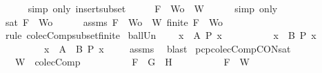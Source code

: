 \begin{isabellebody}
\ \ \ \ \isamarkupfalse%
\ {\isacharparenleft}simp\ only{\isacharcolon}\ insert{\isacharunderscore}subset{\isacharparenright}\isanewline
\ \ \isamarkupfalse%
\ \isamarkupfalse%
\ {\isachardoublequoteopen}{\isacharbraceleft}F{\isacharbraceright}\ {\isasymunion}\ Wo\ {\isasymsubseteq}\ W{\isachardoublequoteclose}\isanewline
\ \ \ \ \isamarkupfalse%
\ {\isacharparenleft}simp\ only{\isacharcolon}\ {}{\isacharparenright}\isanewline
\ \ \isamarkupfalse%
\ {\isachardoublequoteopen}sat\ {\isacharparenleft}{\isacharbraceleft}F{\isacharbraceright}\ {\isasymunion}\ Wo{\isacharparenright}{\isachardoublequoteclose}\isanewline
\ \ \ \ \isamarkupfalse%
\ assms{\isacharparenleft}{}{\isacharparenright}\ {\isacartoucheopen}{\isacharbraceleft}F{\isacharbraceright}\ {\isasymunion}\ Wo\ {\isasymsubseteq}\ W{\isacartoucheclose}\ {\isacartoucheopen}finite\ {\isacharparenleft}{\isacharbraceleft}F{\isacharbraceright}\ {\isasymunion}\ Wo{\isacharparenright}{\isacartoucheclose}\ \isamarkupfalse%
\ {\isacharparenleft}rule\ colecComp{\isacharunderscore}subset{\isacharunderscore}finite{\isacharparenright}\isanewline
{}\isamarkupfalse%
%
\endisatagproof
{\isafoldproof}%
%
\isadelimproof
\isanewline
%
\endisadelimproof
\isanewline
{}\isamarkupfalse%
\ ball{\isacharunderscore}Un{\isacharcolon}\ \isanewline
\ \ \ {\isachardoublequoteopen}{\isasymforall}x\ {\isasymin}\ A{\isachardot}\ P\ x{\isachardoublequoteclose}\isanewline
\ \ \ \ \ \ \ \ \ \ {\isachardoublequoteopen}{\isasymforall}x\ {\isasymin}\ B{\isachardot}\ P\ x{\isachardoublequoteclose}\isanewline
\ \ \ \ \ \ \ \ \ {\isachardoublequoteopen}{\isasymforall}x\ {\isasymin}\ {\isacharparenleft}A\ {\isasymunion}\ B{\isacharparenright}{\isachardot}\ P\ x{\isachardoublequoteclose}\ \isanewline
%
\isadelimproof
\ \ %
\endisadelimproof
%
\isatagproof
{}\isamarkupfalse%
\ assms\ \isamarkupfalse%
\ blast%
\endisatagproof
{\isafoldproof}%
%
\isadelimproof
\isanewline
%
\endisadelimproof
\isanewline
{}\isamarkupfalse%
\ pcp{\isacharunderscore}colecComp{\isacharunderscore}CON{\isacharunderscore}sat{}{\isacharcolon}\isanewline
\ \ \ {\isachardoublequoteopen}W\ {\isasymin}\ colecComp{\isachardoublequoteclose}\isanewline
\ \ \ \ \ \ \ \ \ \ {\isachardoublequoteopen}F\ {\isacharequal}\ G\ \isactrlbold {\isasymand}\ H{\isachardoublequoteclose}\isanewline
\ \ \ \ \ \ \ \ \ \ {\isachardoublequoteopen}F\ {\isasymin}\ W{\isachardoublequoteclose}\isanewline

\end{isabellebody}

